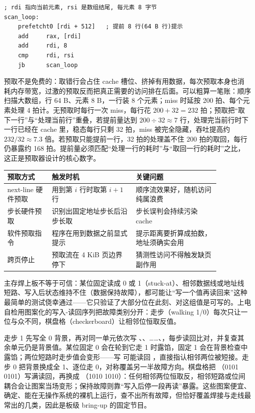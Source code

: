 \begin{lstlisting}
; rdi 指向当前元素, rsi 是数组结尾, 每元素 8 字节
scan_loop:
    prefetcht0 [rdi + 512]   ; 提前 8 行(64 B 行)提示
    add     rax, [rdi]
    add     rdi, 8
    cmp     rdi, rsi
    jb      scan_loop
\end{lstlisting}

预取不是免费的：取错行会占住 cache 槽位、挤掉有用数据，每次预取本身也消耗内存带宽，过激的预取反而把真正需要的访问排在后面。可以粗算一笔账：顺序扫描大数组，行 64 B、元素 8 B，一行装 8 个元素；miss 时延按 200 拍、每个元素处理 4 拍计。无预取时每行一次 miss，每行花 $200+32=232$ 拍；预取把“取下一行”与“处理当前行”重叠，若提前量达到 $200\div 32\approx 7$ 行，处理完当前行时下一行已经在 cache 里，稳态每行只剩 32 拍，miss 被完全隐藏，吞吐提高约 $232/32\approx 7.3$ 倍。若预取只能提前一行，32 拍的处理盖不住 200 拍的取回，每行仍暴露约 168 拍。提前量必须匹配“处理一行的耗时”与“取回一行的耗时”之比，这正是预取器设计的核心数字。

\begin{longtable}{L{0.18\linewidth}L{0.34\linewidth}L{0.34\linewidth}}
\toprule
预取方式 & 触发时机 & 关键问题 \\
\midrule
next-line 硬件预取 & 用到第 $i$ 行时取第 $i+1$ 行 & 顺序流效果好，随机访问纯属浪费 \\
步长硬件预取 & 识别出固定地址步长后沿步长取 & 步长误判会持续污染 cache \\
软件预取指令 & 程序在用到数据之前显式提示 & 提示距离要折算成拍数，地址须确实会用 \\
跨页停止 & 预取流在 4 KiB 页边界停下 & 猜测性访问不得触发缺页副作用 \\
\bottomrule
\end{longtable}

主存焊上板不等于可信：某位固定读成 0 或 1（stuck-at）、相邻数据线或地址线短路、写入后状态维持不住（数据保持故障），都可能让“写一个值再读回来”这种最简单的测试侥幸通过——它只验证了大部分位在此刻、对这组值是可写的。上电自检用图案化的写入-读回序列把故障类别分开：走步（walking 1/0）每次只让一位与众不同，棋盘格（checkerboard）让相邻位恒取反值。

走步 1 先写全 0 背景，再对同一单元依次写 、、……、，每步读回比对，并复查其余单元仍是背景值。某位固定 0 会在轮到它走 1 时露馅，固定 1 会在背景检查中露馅；两位短路时走步值会变形——写  可能读回 ，直接指认相邻两位被短接。走步 0 把背景换成全 1、逐位走 0，对称覆盖另一半故障方向。棋盘格把 （0101 0101）写满读回，再换成 （1010 1010）：任何相邻两位恒取反，相邻短路或位间耦合会让图案当场变形；保持故障则靠“写入后停一段再读”暴露。这些图案便宜、确定、能在无操作系统的裸机上运行，查不出所有故障，但恰好覆盖焊接与走线最常出的几类，因此是板级 bring-up 的固定节目。

